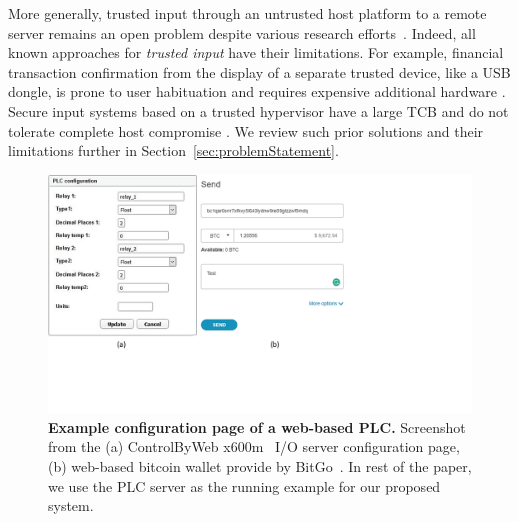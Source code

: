 More generally, trusted input through an untrusted host platform to a remote server remains an open problem despite various research efforts~\cite{sgxio,utp,x86,wimpyKernel,gyrus,weigold2011}. Indeed, all known approaches for \emph{trusted input} have their limitations. For example, financial transaction confirmation from the display of a separate trusted device, like a USB dongle, is prone to user habituation and requires expensive additional hardware \cite{weigold2011}. Secure input systems based on a trusted hypervisor have a large TCB and do not tolerate complete host compromise \cite{sgxio}. We review such prior solutions and their limitations further in Section~\ref{sec:problemStatement}.



\begin{figure}[t]
  \centering
    \includegraphics[trim={0 4cm 10cm 0},clip,width=\linewidth]{chapters/IntegriKey/images/config_pages.pdf}
    \caption[Example configuration page of a web-based PLC]{\textbf{Example configuration page of a web-based PLC.} Screenshot from the (a) ControlByWeb x600m~\cite{controlbyweb} I/O server configuration page, (b) web-based bitcoin wallet provide by BitGo~\cite{bitgo}. In rest of the paper, we use the PLC server as the running example for our proposed system.}

    \label{fig:PLC}
\end{figure}


